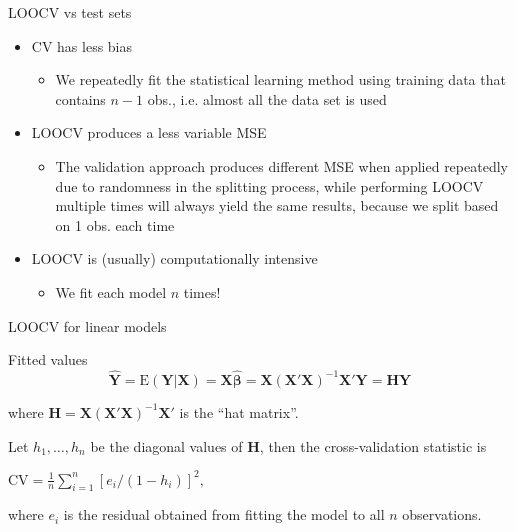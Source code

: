 \documentclass[14pt]{beamer}
\begin{document}
\begin{frame}{LOOCV vs test sets}
\begin{itemize}
\item CV has less bias
\begin{itemize}
\item We repeatedly fit the statistical learning method using training data
that contains $n-1$ obs., i.e. almost all the data set is used
\end{itemize}
\item LOOCV produces a less variable MSE
\begin{itemize}
\item The validation approach produces different MSE when applied
repeatedly due to randomness in the splitting process, while
performing LOOCV multiple times will always yield the same
results, because we split based on 1 obs. each time
\end{itemize}
\item LOOCV is (usually) computationally intensive
\begin{itemize}
\item We fit each model $n$ times! 
\end{itemize}
\end{itemize}
\end{frame}

\begin{frame}{LOOCV for linear models}


\begin{block}{Fitted values}\vspace*{-0.2cm}
\[
\hat{\bm{Y}} =
\text{E}(\bm{Y}|\bm{X}) =
\bm{X}\hat{\bm{\beta}} = \bm{X}(\bm{X}'\bm{X})^{-1}\bm{X}'\bm{Y} = \bm{H}\bm{Y}
\]
\end{block}
where $\bm{H} = \bm{X}(\bm{X}'\bm{X})^{-1}\bm{X}'$ is the ``hat matrix''.\pause


Let $h_1,\dots,h_n$ be the diagonal values of $\bm{H}$, then the cross-validation statistic is
\begin{block}{}
\centerline{$\displaystyle
\text{CV} = \frac1n\sum_{i=1}^n[e_i/(1-h_i)]^2,$}
\end{block}
where $e_i$ is the residual obtained from fitting the model to all $n$ observations.


\end{frame}
\end{document}

